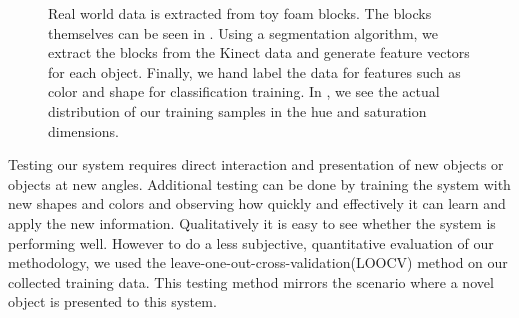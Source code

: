 \documentclass[11pt]{article}
\begin{document}
\begin{figure}[h!]
\centering
{}
\caption{Real world data is extracted from toy foam blocks. The blocks
    themselves can be seen in . Using a segmentation
    algorithm, we extract the blocks from the Kinect data 
    and generate feature vectors for each object.
    Finally, we hand label the data for features such as color and shape for
    classification training. In , we see the actual
    distribution of our training samples in the hue and saturation
    dimensions.}
\label{fig:objects}
\end{figure}





Testing our system requires direct interaction and presentation of new objects
or objects at new angles.  Additional testing can be done by training the
system with new shapes and colors and observing how quickly and effectively it
can learn and apply the new information.  Qualitatively it is easy to see
whether the system is performing well.  However to do a less subjective,
quantitative evaluation of our methodology, we used the leave-one-out-cross-validation(LOOCV) method on our collected training data.  This testing method mirrors the
scenario where a novel object is presented to this system.
\end{document}

